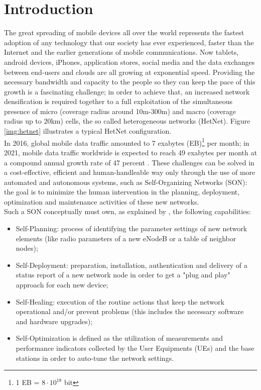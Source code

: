 \documentclass[conference,10pt]{IEEEtran}
\begin{document}
\section{Introduction}\label{sec:intro}
The great spreading of mobile devices all over the world represents the fastest adoption of any technology that
our society has ever experienced, faster than the Internet and the earlier generations of mobile
communications. Now tablets, android devices, iPhones, application stores, social media and the data
exchanges between end-users and clouds are all growing at exponential speed. Providing the necessary bandwidth and capacity to the people so they can keep the pace of this growth is a fascinating challenge; in order to achieve that, an increased network densification is required together to a full exploitation of the simultaneous presence of micro (coverage radius around 10m-300m) and macro (coverage radius up to 20km) cells, the so called heterogeneous networks (HetNet). Figure \ref{img:hetnet} illustrates a typical HetNet configuration.\\
In 2016, global mobile data traffic amounted to 7 exabytes (EB)\footnote{1 EB = $8\cdot 10^{18}$ bit} per month; in 2021, mobile data traffic worldwide is expected to reach 49 exabytes per month at a compound annual growth rate of 47 percent \cite{indexglobal}.
These challenges can be solved in a cost-effective, efficient and human-handleable way only through the use of more automated and autonomous systems, such as Self-Organizing Networks (SON): the goal is to minimize the human intervention in the planning, deployment, optimization and maintenance activities of these new networks.\\
Such a SON conceptually must own, as explained by \cite{ramiro2011self}, the following capabilities:
\begin{itemize}
\item Self-Planning: process of identifying the parameter settings of new network elements (like radio parameters of a new eNodeB or a table of neighbor nodes);
\item Self-Deployment: preparation, installation, authentication and delivery of a status report of
a new network node in order to get a "plug and play" approach for each new device;
\item Self-Healing: execution of the routine actions that keep the network operational and/or
prevent problems (this includes the necessary software and hardware upgrades);
\item Self-Optimization is defined as the utilization of measurements and performance indicators
collected by the User Equipments (UEs) and the base stations in order to auto-tune the network
settings.
\end{itemize}
\end{document}
